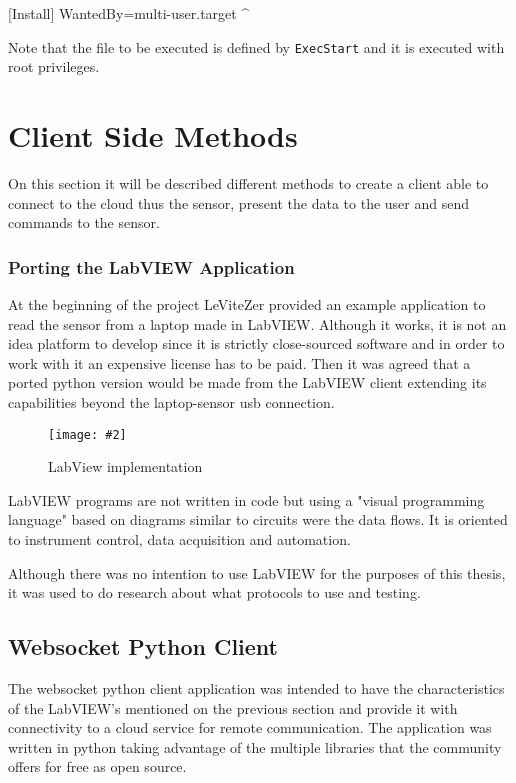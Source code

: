 \documentclass[hidelinks,11pt,a4paper,oneside,article]{memoir}
\newcommand{\putimage}[3][10] %
{
\begin{figure}[h]
	\centering
	\captionsetup{justification=centering}
	\texttt{[image: \#2]}
	\caption{#3}
	\label{fig:#2}
\end{figure}
}
\begin{document}
[Install]
WantedBy=multi-user.target
^

Note that the file to be executed is defined by \texttt{ExecStart} and it is executed with root privileges.


\section{Client Side Methods}\label{sec:client-application-methods}
On this section it will be described different methods to create a client able to connect to the cloud thus the sensor, present the data to the user and send commands to the sensor.

\subsubsection{Porting the LabVIEW Application}
At the beginning of the project LeViteZer provided an example application to read the sensor from a laptop made in LabVIEW. Although it works, it is not an idea platform to develop since it is strictly close-sourced software and in order to work with it an expensive license has to be paid. Then it was agreed that a ported python version would be made from the LabVIEW client extending its capabilities beyond the laptop-sensor \gls{usb} connection.

    \putimage{labview}{LabView implementation}
    
LabVIEW programs are not written in code but using a "visual programming language" based on diagrams similar to circuits were the data flows. It is oriented to instrument control, data acquisition and  automation.~\cite{labview}

Although there was no intention to use LabVIEW for the purposes of this thesis, it was used to do research about what protocols to use and testing.


\subsection{Websocket Python Client}\label{sec:websocket-python-client}
The websocket python client application was intended to have the characteristics of the LabVIEW's mentioned on the previous section and provide it with connectivity to a cloud service for remote communication. The application was written in python taking advantage of the multiple libraries that the community offers for free as open source.
\end{document}
